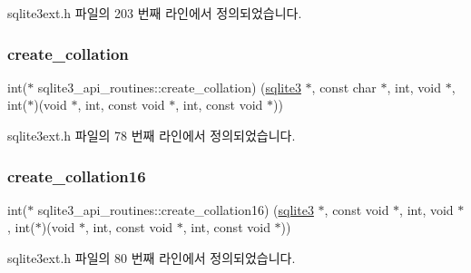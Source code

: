 sqlite3ext.\+h 파일의 203 번째 라인에서 정의되었습니다.

\mbox{\label{structsqlite3__api__routines_a923433105b84b919ea359ef320da55b1}} 
\subsubsection{\texorpdfstring{create\+\_\+collation}{create\_collation}}
{\footnotesize\ttfamily int($\ast$ sqlite3\+\_\+api\+\_\+routines\+::create\+\_\+collation) (\hyperlink{sqlite3_8h_a0ef6f2646262c8a9b24368d8ac140f69}{sqlite3} $\ast$, const char $\ast$, int, void $\ast$, int($\ast$)(void $\ast$, int, const void $\ast$, int, const void $\ast$))}



sqlite3ext.\+h 파일의 78 번째 라인에서 정의되었습니다.

\mbox{\label{structsqlite3__api__routines_ab3fe60d5c018e3ffcad08bec34dc53e7}} 
\subsubsection{\texorpdfstring{create\+\_\+collation16}{create\_collation16}}
{\footnotesize\ttfamily int($\ast$ sqlite3\+\_\+api\+\_\+routines\+::create\+\_\+collation16) (\hyperlink{sqlite3_8h_a0ef6f2646262c8a9b24368d8ac140f69}{sqlite3} $\ast$, const void $\ast$, int, void $\ast$, int($\ast$)(void $\ast$, int, const void $\ast$, int, const void $\ast$))}



sqlite3ext.\+h 파일의 80 번째 라인에서 정의되었습니다.

\mbox{\label{structsqlite3__api__routines_a1e15da46f3dc62b421a8e3d84e83471c}} 
